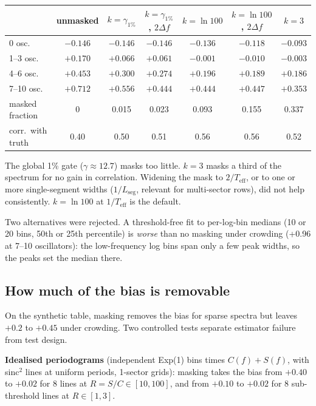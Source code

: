 \documentclass[11pt]{article}
\begin{document}
\begin{center}
\begin{tabular}{lcccccc}
\toprule
 & unmasked & $k=\gamma_{1\%}$ & $k=\gamma_{1\%}$, $2\Delta f$ & $k=\ln 100$ & $k=\ln 100$, $2\Delta f$ & $k=3$ \\
\midrule
0 osc.     & $-0.146$ & $-0.146$ & $-0.146$ & $-0.136$ & $-0.118$ & $-0.093$ \\
1--3 osc.  & $+0.170$ & $+0.066$ & $+0.061$ & $-0.001$ & $-0.010$ & $-0.003$ \\
4--6 osc.  & $+0.453$ & $+0.300$ & $+0.274$ & $+0.196$ & $+0.189$ & $+0.186$ \\
7--10 osc. & $+0.712$ & $+0.556$ & $+0.444$ & $+0.444$ & $+0.447$ & $+0.353$ \\
\midrule
masked fraction & 0 & 0.015 & 0.023 & 0.093 & 0.155 & 0.337 \\
corr.\ with truth & 0.40 & 0.50 & 0.51 & 0.56 & 0.56 & 0.52 \\
\bottomrule
\end{tabular}
\end{center}

The global 1\% gate ($\gamma \approx 12.7$) masks too little. $k=3$ masks a third of the
spectrum for no gain in correlation. Widening the mask to $2/T_\mathrm{eff}$, or to one or
more single-segment widths ($1/L_\mathrm{seg}$, relevant for multi-sector rows), did not
help consistently. $k = \ln 100$ at $1/T_\mathrm{eff}$ is the default.

Two alternatives were rejected. A threshold-free fit to per-log-bin medians (10 or 20
bins, 50th or 25th percentile) is \emph{worse} than no masking under crowding (+0.96 at
7--10 oscillators): the low-frequency log bins span only a few peak widths, so the peaks
set the median there.

\subsection{How much of the bias is removable}

On the synthetic table, masking removes the bias for sparse spectra but leaves $+0.2$ to
$+0.45$ under crowding. Two controlled tests separate estimator failure from test
design.

\textbf{Idealised periodograms} (independent Exp(1) bins times $C(f)+S(f)$, with sinc$^2$
lines at uniform periods, 1-sector grids): masking takes the bias from $+0.40$ to $+0.02$
for 8 lines at $R = S/C \in [10,100]$, and from $+0.10$ to $+0.02$ for 8 sub-threshold
lines at $R\in[1,3]$.
\end{document}
